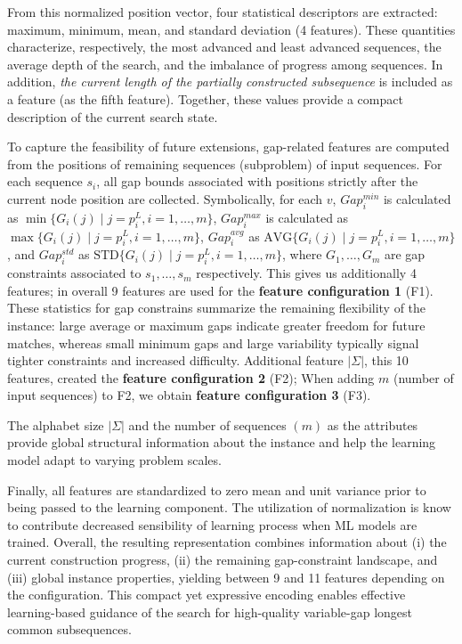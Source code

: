 \documentclass[11pt,a4paper]{article}
\begin{document}
From this normalized position vector, four statistical descriptors are extracted: maximum, minimum, mean, and standard deviation (4 features). These quantities characterize, respectively, the most advanced and least advanced sequences, the average depth of the search, and the imbalance of progress among sequences. In addition, \textit{the current length of the partially constructed subsequence} is included as a feature (as the fifth feature). Together, these values provide a compact description of the current search state.

To capture the feasibility of future extensions, gap-related features are computed from the positions of remaining sequences (subproblem) of input sequences. For each sequence $s_i$, all gap bounds associated with positions strictly after the current node position are collected. Symbolically, for each $v$,  $Gap^{min}_i$ is calculated as $\min\{ G_i(j) \mid j=p_i^L, i=1, \ldots, m \}$,  $Gap^{max}_i$ is calculated as $\max\{ G_i(j) \mid j=p_i^L, i=1, \ldots, m \}$,  $Gap^{avg}_i$  as $\text{AVG}\{ G_i(j) \mid j=p_i^L, i=1, \ldots, m \}$, and  
 $Gap^{std}_i$  as $\text{STD}\{ G_i(j) \mid j=p_i^L, i=1, \ldots, m \}$, where $G_1, \ldots, G_m$ are gap constraints associated to $s_1, \ldots, s_m$ respectively. This gives us additionally 4 features; in overall 9 features are used for the \textbf{feature configuration 1} (F1).  These statistics for gap constrains summarize the remaining flexibility of the instance: large average or maximum gaps indicate greater freedom for future matches, whereas small minimum gaps and large variability typically signal tighter constraints and increased difficulty.
  Additional feature $|\Sigma|$, this 10 features, created the \textbf{feature configuration 2} (F2); When adding $m$ (number of input sequences) to F2, we obtain \textbf{feature configuration 3} (F3). 
 

The alphabet size $|\Sigma|$ and the number of sequences $(m)$ as the attributes provide global structural information about the instance and help the learning model adapt to varying problem scales.

Finally, all features are standardized to zero mean and unit variance prior to being passed to the learning component. The utilization of normalization is know to contribute decreased sensibility of learning process when ML models are trained.  
Overall, the resulting representation combines information about (i) the current construction progress, (ii) the remaining gap-constraint landscape, and (iii) global instance properties, yielding between 9 and 11 features depending on the configuration. This compact yet expressive encoding enables effective learning-based guidance of the search for high-quality variable-gap longest common subsequences.
 
\end{document}
